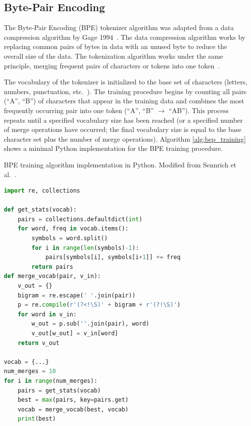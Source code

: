 \documentclass[12pt]{article}
\begin{document}
\subsection{Byte-Pair Encoding}\label{sec:bpe}
The Byte-Pair Encoding (BPE) tokenizer algorithm was adapted from a data compression algorithm by Gage 1994~\cite{gage_feb94_1994}. The data compression
algorithm works by replacing common pairs of bytes in data with an unused byte to reduce the overall size of the data. The tokenization algorithm
works under the same principle, merging frequent pairs of characters or tokens into one token~\cite{sennrich_neural_2016}.

The vocabulary of the tokenizer is initialized to the base set of characters (letters, numbers, punctuation, etc.~). The training procedure begins by
counting all pairs (``A'', ``B'') of characters that appear in the training data and combines the most frequently occurring pair into one token
(``A'', ``B'' $\rightarrow$ ``AB''). This process repeats until a specified vocabulary size has been reached (or a specified number of merge
operations have occurred; the final vocabulary size is equal to the base character set plus the number of merge operations). Algorithm
\ref{alg:bep_training} shows a minimal Python implementation for the BPE training procedure.

\begin{algorithm}[!t]
    \caption{BPE training algorithm implementation in Python. Modified from Sennrich et al.~\cite{sennrich_neural_2016}.}
    \label{alg:bep_training}
    \begin{lstlisting}[language=Python]
import re, collections

def get_stats(vocab):
    pairs = collections.defaultdict(int)
    for word, freq in vocab.items():
        symbols = word.split()
        for i in range(len(symbols)-1):
            pairs[symbols[i], symbols[i+1]] += freq
        return pairs
def merge_vocab(pair, v_in):
    v_out = {}
    bigram = re.escape(' '.join(pair))
    p = re.compile(r'(?<!\S)' + bigram + r'(?!\S)')
    for word in v_in:
        w_out = p.sub(''.join(pair), word)
        v_out[w_out] = v_in[word]
    return v_out

vocab = {...}
num_merges = 10
for i in range(num_merges):
    pairs = get_stats(vocab)
    best = max(pairs, key=pairs.get)
    vocab = merge_vocab(best, vocab)
    print(best)
    \end{lstlisting}
\end{algorithm}
\end{document}
